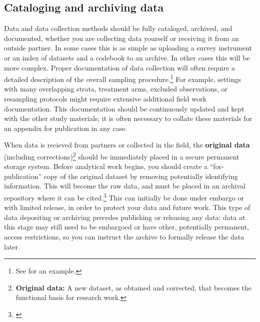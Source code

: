 \documentclass[]{tufte-book}
\begin{document}
\hypertarget{cataloging-and-archiving-data}{%
\subsection*{Cataloging and archiving
data}\label{cataloging-and-archiving-data}}

Data and data collection methods should be fully cataloged, archived,
and documented, whether you are collecting data yourself or receiving it
from an outside partner. In some cases this is as simple as uploading a
survey instrument or an index of datasets and a codebook to an
archive. In other cases this will be more complex.
Proper documentation of data collection will often require a detailed
description of the overall sampling procedure.\footnote{See
  \cite{@yishay2016gender} for an example.} For example, settings with
many overlapping strata, treatment arms, excluded observations, or
resampling protocols might require extensive additional field work
documentation. This documentation should be continuously updated and
kept with the other study materials; it is often necessary to collate
these materials for an appendix for publication in any case.

When data is recieved from partners or collected in the field, the
\textbf{original data} (including corrections)\footnote{\textbf{Original
  data:} A new dataset, as obtained and corrected, that becomes the
  functional basis for research work.} should be
immediately placed in a secure permanent storage system. Before
analytical work begins, you should create a ``for-publication'' copy of
the original dataset by removing potentially identifying
information. This will become the raw data, and
must be placed in an archival repository where it can be
cited.\footnote{\cite{@vilhuber2020report}} This
can initially be done under embargo or with limited release, in order to
protect your data and future work. This type of data depositing or
archiving precedes publishing or releasing any data: data at this stage
may still need to be embargoed or have other, potentially permanent,
access restrictions, so you can instruct the archive to formally release
the data later.
\end{document}
